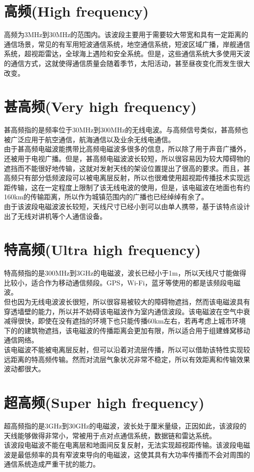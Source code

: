 \documentclass[UTF8]{article}
\begin{document}
\begin{CJK}{UTF8}{gkai}
\section{高频(High frequency)}
高频为3MHz到30MHz的范围内。该波段主要用于需要较大带宽和具有一定距离的通信场景，常见的有军用短波通信系统，地空通信系统，短波区域广播，岸舰通信系统，超视距雷达，全球海上遇险和安全系统。但是，这些通信系统大多使用天波的通信方式，这就使得通信质量会随着季节，太阳活动，甚至昼夜变化而发生很大改变\cite{Ghosh2002Electromagnetic}。
\section{甚高频(Very high frequency)}
甚高频指的是频率位于30MHz到300MHz的无线电波。与高频信号类似，甚高频也被广泛应用于航空通信，航海通信以及业余无线电通信。\\
由于甚高频电磁波能携带比高频电磁波多很多的信息，所以除了用于声音广播外，还被用于电视广播。但是，甚高频电磁波波长较短，所以很容易因为较大障碍物的遮挡而不能很好地传输，这就对发射天线的架设位置提出了很高的要求。而且，甚高频只有部分低频波段可以被电离层反射，所以也很难使用超视距传播技术实现远距传输，这在一定程度上限制了该无线电波的使用，但是，该电磁波在地面也有约160km的传输距离，所以作为城镇范围内的广播也已经绰绰有余了\cite{Seybold2005Introduction}。\\
由于该波段电磁波波长较短，天线尺寸已经小到可以由单人携带，基于该特点设计出了无线对讲机等个人通信设备。
\section{特高频(Ultra high frequency)}
特高频指的是300MHz到3GHz的电磁波，波长已经小于1m，所以天线尺寸能做得比较小，适合作为移动通信频段。GPS，Wi-Fi，蓝牙等使用的都是该频段电磁波。\\
但也因为无线电波波长很短，所以很容易被较大的障碍物遮挡，然而该电磁波具有穿透墙壁的能力，所以并不妨碍该电磁波作为室内通信波段。该电磁波在空气中衰减得很快，即使在没有遮挡的环境下也只能传播60km左右，若再考虑上城市环境下的的建筑物遮挡，该电磁波的传播距离会更加有限，所以适合用于组建蜂窝移动通信网络。\\
该电磁波不能被电离层反射，但可以沿着对流层传播，所以可以借助该特性实现较远距离的特高频传输。然而对流层气象状况非常不稳定，所以有效距离和传输效果波动都很大。
\section{超高频(Super high frequency)}
超高频指的是3GHz到30GHz的电磁波，波长处于厘米量级，正因如此，该波段的天线能够做得非常小，常被用于点对点通信系统，数据链和雷达系统。\\
该波段电磁波不能在电离层和地面间反复反射，无法实现超视距传输。该波段电磁波是最低频率的具有窄波束导向的电磁波，这使其具有大功率传播而不会对周围的通信系统造成严重干扰的能力。

\end{CJK}
\end{document}
